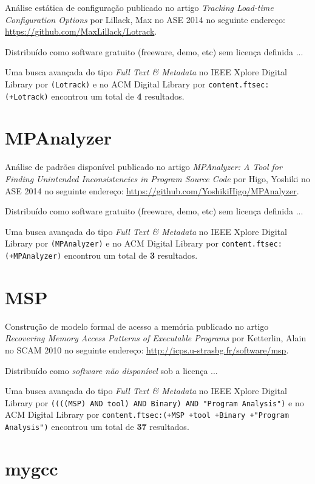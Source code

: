 Análise estática de configuração
publicado no artigo
{\it Tracking Load-time Configuration Options}
por
Lillack, Max
no
ASE
2014
no seguinte endereço:
\url{https://github.com/MaxLillack/Lotrack}.

Distribuído como software gratuito (freeware, demo, etc)
sem licença definida ...


Uma busca avançada do tipo {\it Full Text \& Metadata} no IEEE Xplore Digital Library por
\texttt{(Lotrack)}
e no ACM Digital Library por
\texttt{content.ftsec:(+Lotrack)}
encontrou um total de
{\bf 4}
resultados.

\section{MPAnalyzer}

Análise de padrões disponível
publicado no artigo
{\it MPAnalyzer: A Tool for Finding Unintended Inconsistencies in Program Source Code}
por
Higo, Yoshiki
no
ASE
2014
no seguinte endereço:
\url{https://github.com/YoshikiHigo/MPAnalyzer}.

Distribuído como software gratuito (freeware, demo, etc)
sem licença definida ...


Uma busca avançada do tipo {\it Full Text \& Metadata} no IEEE Xplore Digital Library por
\texttt{(MPAnalyzer)}
e no ACM Digital Library por
\texttt{content.ftsec:(+MPAnalyzer)}
encontrou um total de
{\bf 3}
resultados.

\section{MSP}

Construção de modelo formal de acesso a memória
publicado no artigo
{\it Recovering Memory Access Patterns of Executable Programs}
por
Ketterlin, Alain
no
SCAM
2010
no seguinte endereço:
\url{http://icps.u-strasbg.fr/software/msp}.

Distribuído como {\it software não disponível}
sob a licença  ...


Uma busca avançada do tipo {\it Full Text \& Metadata} no IEEE Xplore Digital Library por
\texttt{((((MSP) AND tool) AND Binary) AND "Program Analysis")}
e no ACM Digital Library por
\texttt{content.ftsec:(+MSP +tool +Binary +"Program Analysis")}
encontrou um total de
{\bf 37}
resultados.

\section{mygcc}

